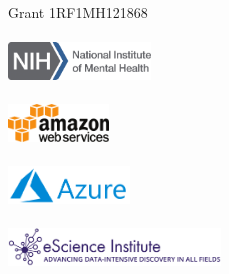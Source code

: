 \documentclass[a0paper,landscape,fontscale=0.365]{baposter}
\begin{document}
\begin{poster}
{Grant 1RF1MH121868\\
\vspace{0.00001cm}\\

\includegraphics[align=c, height=1.0cm]{logos/nimh-logo.png}\\
\vspace{0.1cm}\\
\includegraphics[align=c, height=1.0cm]{logos/awslogo}\\
\vspace{0.1cm}\\
\includegraphics[align=c, height=1.0cm]{logos/azure}\\
\vspace{0.1cm}\\
\includegraphics[align=c, height=1.0cm]{logos/eSciencelogo.png}

}

\end{poster}
\end{document}
